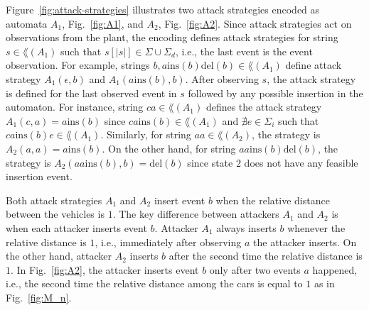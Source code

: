 \begin{example}
Figure~\ref{fig:attack-strategies} illustrates two attack strategies encoded as automata $A_1$, Fig.~\ref{fig:A1}, and $A_2$, Fig.~\ref{fig:A2}.
Since attack strategies act on observations from the plant, the encoding defines attack strategies for string $s\in \lang(A_1)$ such that $s[|s|] \in \Sigma\cup\Sigma_d$, i.e., the last event is the event observation.
For example, strings $b, a\text{ins}(b)\text{del}(b) \in \lang(A_1)$ define attack strategy $A_1(\epsilon,b)$ and $A_1(a\text{ins}(b),b)$.
After observing $s$, the attack strategy is defined for the last observed event in $s$ followed by any possible insertion in the automaton.
For instance, string $ca\in \lang(A_1)$ defines the attack strategy $A_1(c,a) = a\text{ins}(b)$ since $ca\text{ins}(b) \in \lang(A_1)$ and $\nexists e \in \Sigma_i$ such that $ca\text{ins}(b)e \in \lang(A_1)$.
Similarly, for string $aa\in \lang(A_2)$, the strategy is $A_2(a,a) = a\text{ins}(b)$.
On the other hand, for string $aa\text{ins}(b)\text{del}(b)$, the strategy is $A_2(aa\text{ins}(b),b) = \text{del}(b)$ since state $2$ does not have any feasible insertion event.

Both attack strategies $A_1$ and $A_2$ insert event $b$ when the relative distance between the vehicles is $1$.
The key difference between attackers $A_1$ and $A_2$ is when each attacker inserts event $b$. 
Attacker $A_1$ always inserts $b$ whenever the relative distance is $1$, i.e., immediately after observing $a$ the attacker inserts.
On the other hand, attacker $A_2$ inserts $b$ after the second time the relative distance is $1$.
In Fig.~\ref{fig:A2}, the attacker inserts event $b$ only after two events $a$ happened, i.e., the second time the relative distance among the cars is equal to $1$ as in Fig.~\ref{fig:M_n}. 


\end{example}

